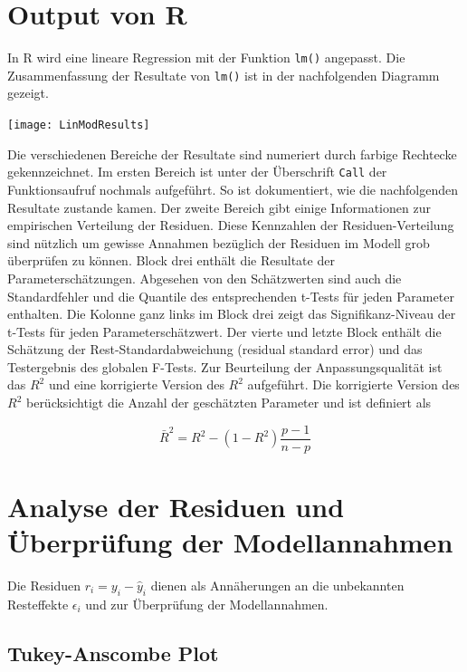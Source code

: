 \documentclass[]{book}
\begin{document}
\section{Output von R}\label{output-von-r}

In R wird eine lineare Regression mit der Funktion \texttt{lm()}
angepasst. Die Zusammenfassung der Resultate von \texttt{lm()} ist in
der nachfolgenden Diagramm gezeigt.

\begin{center}\texttt{[image: LinModResults]} \end{center}

Die verschiedenen Bereiche der Resultate sind numeriert durch farbige
Rechtecke gekennzeichnet. Im ersten Bereich ist unter der Überschrift
\texttt{Call} der Funktionsaufruf nochmals aufgeführt. So ist
dokumentiert, wie die nachfolgenden Resultate zustande kamen. Der zweite
Bereich gibt einige Informationen zur empirischen Verteilung der
Residuen. Diese Kennzahlen der Residuen-Verteilung sind nützlich um
gewisse Annahmen bezüglich der Residuen im Modell grob überprüfen zu
können. Block drei enthält die Resultate der Parameterschätzungen.
Abgesehen von den Schätzwerten sind auch die Standardfehler und die
Quantile des entsprechenden t-Tests für jeden Parameter enthalten. Die
Kolonne ganz links im Block drei zeigt das Signifikanz-Niveau der
t-Tests für jeden Parameterschätzwert. Der vierte und letzte Block
enthält die Schätzung der Rest-Standardabweichung (residual standard
error) und das Testergebnis des globalen F-Tests. Zur Beurteilung der
Anpassungsqualität ist das \(R^2\) und eine korrigierte Version des
\(R^2\) aufgeführt. Die korrigierte Version des \(R^2\) berücksichtigt
die Anzahl der geschätzten Parameter und ist definiert als

\begin{equation}\bar{R}^2 = R^2 - (1-R^2)\frac{p-1}{n-p}\end{equation}

\section{Analyse der Residuen und Überprüfung der
Modellannahmen}\label{analyse-der-residuen-und-uberprufung-der-modellannahmen}

Die Residuen \(r_i = y_i - \hat{y}_i\) dienen als Annäherungen an die
unbekannten Resteffekte \(\epsilon_i\) und zur Überprüfung der
Modellannahmen.

\subsection{Tukey-Anscombe Plot}\label{tukey-anscombe-plot}
\end{document}
